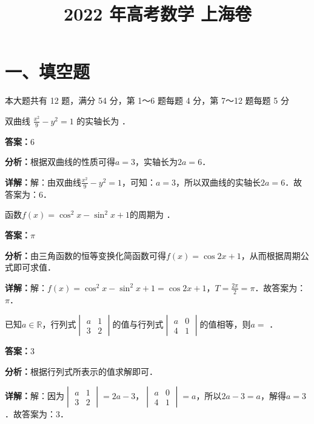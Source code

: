 ﻿\title{2022 年高考数学 上海卷}
\date{}
\maketitle

\section*{一、填空题}
本大题共有 12 题，满分 54 分，第 1～6 题每题 4 分，第 7～12 题每题 5 分

\begin{question}[points=4]
双曲线 $\frac{x^2}{9} - y^2 = 1$ 的实轴长为 ．
\fillin[{$6$}]
\begin{solution}
\textbf{答案：}$6$

\textbf{分析：}根据双曲线的性质可得$a=3$，实轴长为$2a=6$．

\textbf{详解：}解：由双曲线$\frac{x^2}{9} - y^2 = 1$，可知：$a=3$，所以双曲线的实轴长$2a=6$．故答案为：$6$．
\end{solution}
\end{question}

\begin{question}[points=4]
函数$f(x) = \cos^2 x - \sin^2 x + 1$的周期为 ．
\fillin[{$\pi$}]
\begin{solution}
\textbf{答案：}$\pi$

\textbf{分析：}由三角函数的恒等变换化简函数可得$f(x)=\cos 2x+1$，从而根据周期公式即可求值．

\textbf{详解：}解：$f(x)=\cos^2 x - \sin^2 x + 1 = \cos 2x + 1$，$T=\frac{2\pi}{2}=\pi$．故答案为：$\pi$．
\end{solution}
\end{question}

\begin{question}[points=4]
已知$a \in \mathbb{R}$，行列式$\begin{vmatrix} a & 1 \\ 3 & 2 \end{vmatrix}$的值与行列式$\begin{vmatrix} a & 0 \\ 4 & 1 \end{vmatrix}$的值相等，则$a=$ ．
\fillin[{$3$}]
\begin{solution}
\textbf{答案：}$3$

\textbf{分析：}根据行列式所表示的值求解即可．

\textbf{详解：}解：因为$\begin{vmatrix} a & 1 \\ 3 & 2 \end{vmatrix}=2a-3$，$\begin{vmatrix} a & 0 \\ 4 & 1 \end{vmatrix}=a$，所以$2a-3=a$，解得$a=3$．故答案为：$3$．
\end{solution}
\end{question}

